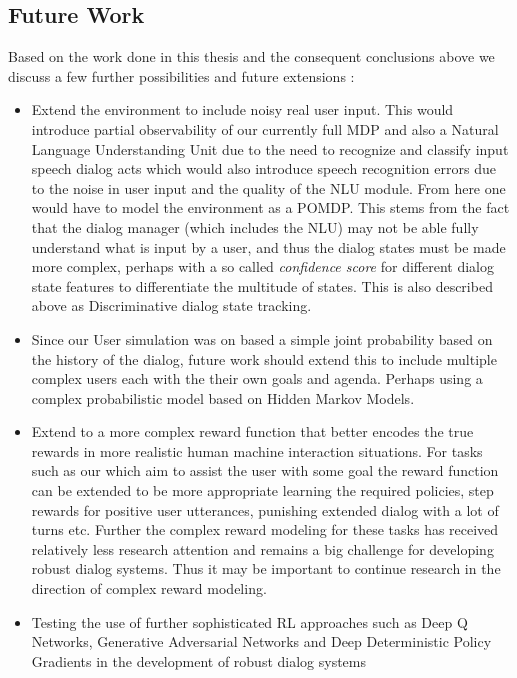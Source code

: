 \documentclass[12pt]{extarticle}
\numberwithin{equation}{section}
\begin{document}
	\subsection{Future Work}
	Based on the work done in this thesis and the consequent conclusions above we discuss a few further possibilities and future extensions :
	\begin{itemize}
		\item Extend the environment to include noisy real user input. This would introduce partial observability of our currently full MDP and also a Natural Language Understanding Unit due to the need to recognize and classify input speech dialog acts which would also introduce speech recognition errors due to the noise in user input and the quality of the NLU module. From here one would have to model the environment as a POMDP\cite{Sutton-introRL}. This stems from the fact that the dialog manager (which includes the NLU) may not be able fully understand what is input by a user, and thus the dialog states must be made more complex, perhaps with a so called \textit{confidence score} for different dialog state features to differentiate the multitude of states. This is also described above as Discriminative dialog state tracking.
		\item Since our User simulation was on based a simple joint probability based on the history of the dialog, future work should extend this to include multiple complex users each with the their own goals and agenda. Perhaps using a complex probabilistic model based on Hidden Markov Models.
		\item Extend to a more complex reward function that better encodes the true rewards in more realistic human machine interaction situations. For tasks such as our which aim to assist the user with some goal the reward function can be extended to be more appropriate learning the required policies, step rewards for positive user utterances, punishing extended dialog with a lot of turns etc. Further the complex reward modeling for these tasks has received relatively less research attention and remains a big challenge for developing robust dialog systems. Thus it may be important to continue research in the direction of complex reward modeling.
		\item Testing the use of further sophisticated RL approaches such as Deep Q Networks, Generative Adversarial Networks and Deep Deterministic Policy Gradients in the development of robust dialog systems
	\end{itemize}
	
\end{document}
